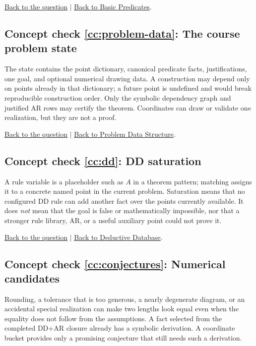 \documentclass[reqno]{amsart}
\DeclareMathOperator{\1}{\textbf{1}}
\begin{document}
\noindent\hyperlink{ccq:predicates}{Back to the question}
$\mid$
\hyperref[sec: Basic Predicates]{Back to Basic Predicates}.

\hypertarget{cca:problem-data}{}
\subsection*{Concept check \ref{cc:problem-data}: The course problem state}

The state contains the point dictionary, canonical predicate facts,
justifications, one goal, and optional numerical drawing data. A construction
may depend only on points already in that dictionary; a future point is
undefined and would break reproducible construction order. Only the symbolic
dependency graph and justified AR rows may certify the theorem. Coordinates
can draw or validate one realization, but they are not a proof.

\noindent\hyperlink{ccq:problem-data}{Back to the question}
$\mid$
\hyperref[sec: Problem Data Structure]{Back to Problem Data Structure}.

\hypertarget{cca:dd}{}
\subsection*{Concept check \ref{cc:dd}: DD saturation}

A rule variable is a placeholder such as $A$ in a theorem pattern; matching
assigns it to a concrete named point in the current problem. Saturation means
that no configured DD rule can add another fact over the points currently
available. It does \emph{not} mean that the goal is false or mathematically
impossible, nor that a stronger rule library, AR, or a useful auxiliary point
could not prove it.

\noindent\hyperlink{ccq:dd}{Back to the question}
$\mid$
\hyperref[sec: Deductive Database]{Back to Deductive Database}.

\hypertarget{cca:conjectures}{}
\subsection*{Concept check \ref{cc:conjectures}: Numerical candidates}

Rounding, a tolerance that is too generous, a nearly degenerate diagram, or an
accidental special realization can make two lengths look equal even when the
equality does not follow from the assumptions. A fact selected from the
completed DD+AR closure already has a symbolic derivation. A coordinate bucket
provides only a promising conjecture that still needs such a derivation.
\end{document}
